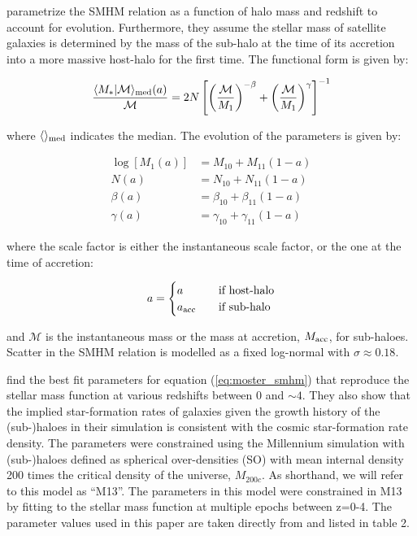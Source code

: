 \documentclass[a4paper,fleqn,usenatbib]{mnras}
\begin{document}
\cite{Moster:2013ab} parametrize the SMHM relation as a function of halo mass and redshift to account for evolution.  Furthermore, they assume the stellar mass of satellite galaxies is determined by the mass of the sub-halo at the time of its accretion into a more massive host-halo for the first time.  The functional form is given by:
%
\begin{linenomath}
\begin{equation}
\label{eq:moster_smhm}
\frac{\langle M_{*} | \mathcal{M}\rangle_{\rm med}(a)}{\mathcal{M}} = 2N\left[ \left(\frac{\mathcal{M}}{{M}_1} \right)^{-\beta} + \left( \frac{\mathcal{M}}{{M}_1} \right)^{\gamma} \right]^{-1}
\end{equation}
\end{linenomath}
%
where $\langle\rangle_{\rm med}$ indicates the median.  The evolution of the parameters is given by:
%
\begin{linenomath}
\begin{align}
\label{eq:smhm_params}
\log[{M}_1(a)]& = {M}_{10} + {M}_{11}(1-a) \\
N(a) &= N_{10} + N_{11}(1-a) \\
\beta(a) &= \beta_{10} + \beta_{11}(1-a) \\ 
\gamma(a) &=  \gamma_{10} + \gamma_{11}(1-a)
\end{align}
\end{linenomath}
%
where the scale factor is either the instantaneous scale factor, or the one at the time of accretion:
%
\begin{linenomath}
\begin{equation}
a = 
\begin{cases}
    a      & \quad \text{if host-halo}\\
    a_{\rm acc}  & \quad \text{if sub-halo} \\
  \end{cases}
\end{equation}
\end{linenomath}
%
and $\mathcal{M}$ is the instantaneous mass or the mass at accretion, $M_{\rm acc}$, for sub-haloes.  Scatter in the SMHM relation is modelled as a fixed log-normal with $\sigma \approx 0.18$.

\citet{Moster:2013ab} find the best fit parameters for equation (\ref{eq:moster_smhm}) that reproduce the stellar mass function at various redshifts between 0 and $\sim 4$.  They also show that the implied star-formation rates of galaxies given the growth history of the (sub-)haloes in their simulation is consistent with the cosmic star-formation rate density.  The parameters were constrained using the Millennium simulation with (sub-)haloes defined as spherical over-densities (SO) with mean internal density 200 times the critical density of the universe, $M_{200c}$.   As shorthand, we will refer to this model as ``M13''.  The parameters in this model were constrained in M13 by fitting to the stellar mass function at multiple epochs between z=0-4.  The parameter values used in this paper are taken directly from \citet{Moster:2013ab} and listed in table 2.
      
\end{document}
